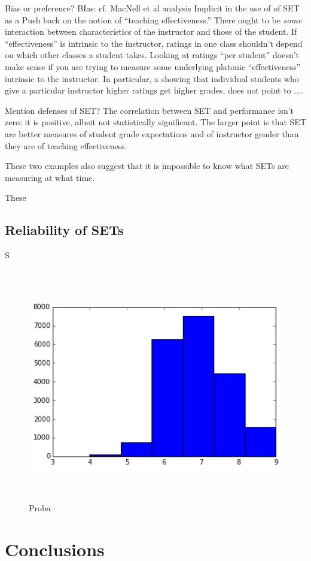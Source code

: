 \documentclass[12pt]{article}
\newcommand{\todo}[1]{{\color{red}{TO DO: \sc #1}}}
\begin{document}
Bias or preference? 
BIas: cf. MacNell et al analysis
Implicit in the use of of SET as a 
Push back on the notion of ``teaching effectiveness.''
There ought to be \emph{some} interaction between characteristics of the
instructor and those of the student.
If ``effectiveness'' is intrinsic to the instructor, ratings in one class shouldn't depend on
which other classes a student takes.
Looking at ratings ``per student'' doesn't make sense if you are trying to
measure some underlying platonic ``effectiveness'' intrinsic to the instructor.
In particular,  a showing that individual students who give a particular instructor higher ratings
get higher grades, does not point to ....\todo{fix me}

Mention defenses of SET?  The correlation between SET and performance isn't zero:
it is positive, albeit not statistically significant.
The larger point is that SET are better measures of student grade expectations and
of instructor gender than they are of teaching effectiveness.

These two examples also suggest that it is impossible to know what SETs are measuring at what time. 

These 


\subsection{Reliability of SETs}

S

\begin{figure}
\begin{centering}
  \caption{Proba}
  \includegraphics[height=4in]{reliability}
\end{centering}
\end{figure}




\section{Conclusions}



\end{document}
